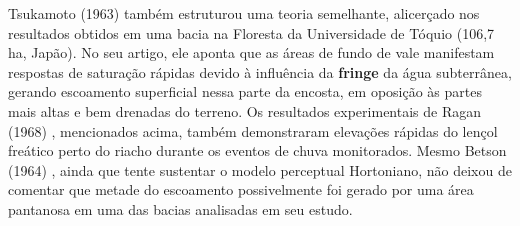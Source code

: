 \documentclass[./main.tex]{subfiles}
\begin{document}
\noindent Tsukamoto (1963) \cite{Tsukamoto1963} também estruturou uma teoria semelhante, alicerçado nos resultados obtidos em uma bacia na Floresta da Universidade de Tóquio (106,7 ha, Japão). No seu artigo, ele aponta que as áreas de fundo de vale manifestam respostas de saturação rápidas devido à influência da \textbf{\gls{fringe}} da água subterrânea, gerando escoamento superficial nessa parte da encosta, em oposição às partes mais altas e bem drenadas do terreno. Os resultados experimentais de Ragan (1968) \cite{Ragan1968}, mencionados acima, também demonstraram elevações rápidas do lençol freático perto do riacho durante os eventos de chuva monitorados. Mesmo Betson (1964) \cite{Betson1964}, ainda que tente sustentar o modelo perceptual Hortoniano, não deixou de comentar que metade do escoamento possivelmente foi gerado por uma área pantanosa em uma das bacias analisadas em seu estudo.
\end{document}
